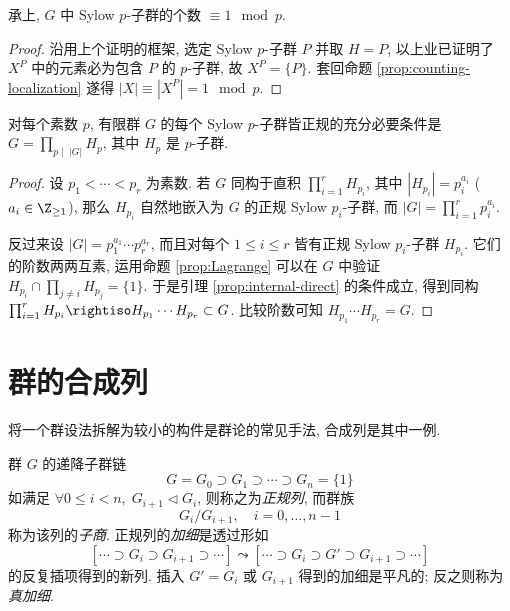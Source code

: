 \begin{theorem}
	承上, $G$ 中 Sylow $p$-子群的个数 $\equiv 1 \mod p$.
\end{theorem}
\begin{proof}
	沿用上个证明的框架, 选定 Sylow $p$-子群 $P$ 并取 $H = P$, 以上业已证明了 $X^P$ 中的元素必为包含 $P$ 的 $p$-子群, 故 $X^P = \{P\}$. 套回命题 \ref{prop:counting-localization} 遂得 $|X| \equiv \left\lvert X^P \right\rvert = 1 \mod p$.
\end{proof}

\begin{proposition}
	 对每个素数 $p$, 有限群 $G$ 的每个 Sylow $p$-子群皆正规的充分必要条件是 $G = \prod_{p \mid\; |G|} H_p$, 其中 $H_p$ 是 $p$-子群.
\end{proposition}
\begin{proof}
	设 $p_1 < \cdots < p_r$ 为素数. 若 $G$ 同构于直积 $\prod_{i=1}^r H_{p_i}$, 其中 $|H_{p_i}| = p_i^{a_i}$ ($a_i \in \Z_{\geq 1}$), 那么 $H_{p_i}$ 自然地嵌入为 $G$ 的正规 Sylow $p_i$-子群, 而 $|G| = \prod_{i=1}^r p_i^{a_i}$.
	
	反过来设 $|G| = p_1^{a_1} \cdots p_r^{a_r}$, 而且对每个 $1 \leq i \leq r$ 皆有正规 Sylow $p_i$-子群 $H_{p_i}$. 它们的阶数两两互素, 运用命题 \ref{prop:Lagrange} 可以在 $G$ 中验证 $H_{p_i} \cap \prod_{j \neq i} H_{p_j} = \{1\}$. 于是引理 \ref{prop:internal-direct} 的条件成立, 得到同构 $\prod_{i=1}^r H_{p_i} \rightiso H_{p_1} \cdots H_{p_r} \subset G$. 比较阶数可知 $H_{p_1} \cdots H_{p_r} = G$.
\end{proof}

\section{群的合成列}\label{sec:composition-series-grp}
将一个群设法拆解为较小的构件是群论的常见手法, 合成列是其中一例.

\begin{definition}[正规列]\label{def:normal-series}
	群 $G$ 的递降子群链
	\[ G = G_0 \supset G_1 \supset \cdots \supset G_n = \{1\} \]
	如满足 $\forall 0 \leq i < n,\;  G_{i+1} \lhd G_i$, 则称之为\emph{正规列}, 而群族
	\[ G_i/G_{i+1}, \quad i=0, \ldots, n-1 \]
	称为该列的\emph{子商}. 正规列的\emph{加细}是透过形如 
	\[ \left[ \cdots \supset G_i \supset G_{i+1} \supset \cdots \right] \leadsto \left[ \cdots \supset G_i \supset G' \supset G_{i+1} \supset \cdots \right] \]
	的反复插项得到的新列. 插入 $G' = G_i$ 或 $G_{i+1}$ 得到的加细是平凡的; 反之则称为\emph{真加细}.
\end{definition}

